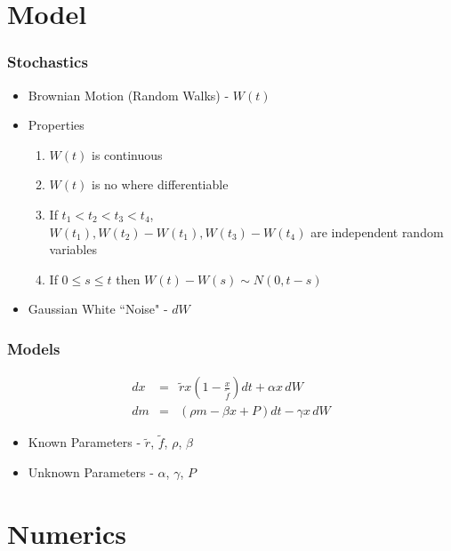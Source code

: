 
\section{Model}

\begin{frame}
    \frametitle{Stochastics}
	\begin{itemize}
		\item Brownian Motion (Random Walks) - $W(t)$
		\item Properties
	\begin{enumerate}[i]
		\item $W(t)$ is continuous
		\item $W(t)$ is no where differentiable
		\item If $t_{1}<t_{2}<t_{3}<t_{4}$, \\
			$W(t_{1}), W(t_{2})-W(t_{1}),  W(t_{3})-W(t_{4})$ are independent random variables
		\item If $0 \le s\le t$ then $W(t)-W(s) \sim N(0, t-s)$
	\end{enumerate}
		\item Gaussian White ``Noise" - $dW$
	\end{itemize}
\end{frame}



\begin{frame}
    \frametitle{Models}
	\begin{eqnarray}
		dx &=& \tilde{r} x \left( 1- \frac{x}{\tilde{f}}\right) dt +\alpha x \, dW \\
		dm &=& ( \rho m - \beta x + P) dt - \gamma x \, dW
	\end{eqnarray}
	\begin{itemize}
		\item Known Parameters - $\tilde{r}$, $\tilde{f}$, $\rho$, $\beta$
		\item Unknown Parameters - $\alpha$, $\gamma$, $P$
	\end{itemize}
\end{frame}




\section{Numerics}


